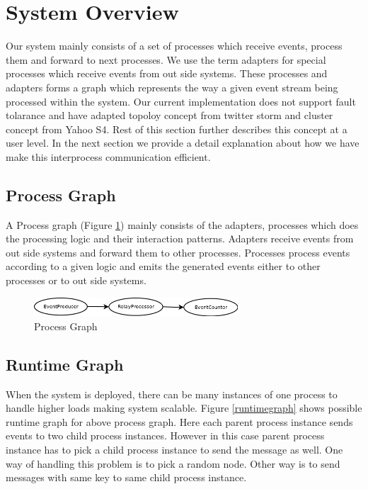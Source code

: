 \section{System Overview}
Our system mainly consists of a set of processes which receive events, process them and forward to next processes. We use the term adapters for special processes which receive events from out side systems. These processes and adapters forms a graph which represents the way a given event stream being processed within the system. Our current implementation does not support fault tolarance and have adapted topoloy concept from twitter storm\cite{twitterStorm} and cluster concept from Yahoo S4\cite{neumeyer2010s4}. Rest of this section further describes this concept at a user level. In the next section we provide a detail explanation about how we have make this interprocess communication efficient. 
\subsection{Process Graph}
A Process graph (Figure \ref{processgraph}) mainly consists of the adapters, processes which does the processing logic and their interaction patterns. Adapters receive events from out side systems and forward them to other processes. Processes process events according to a given logic and emits the generated events either to other processes or to out side systems. 

\begin{figure}[!t]
	\centering
	\includegraphics[width=3.0in]{processgraph.png}
	\caption{Process Graph}
	\label{processgraph}
\end{figure}

\subsection{Runtime Graph}
When the system is deployed, there can be many instances of one process to handle higher loads making system scalable. Figure \ref{runtimegraph} shows possible runtime graph for above process graph. Here each parent process instance sends events to two child process instances. However in this case parent process instance has to pick a child process instance to send the message as well. One way of handling this problem is to pick a random node. Other way is to send messages with same key to same child process instance. 

